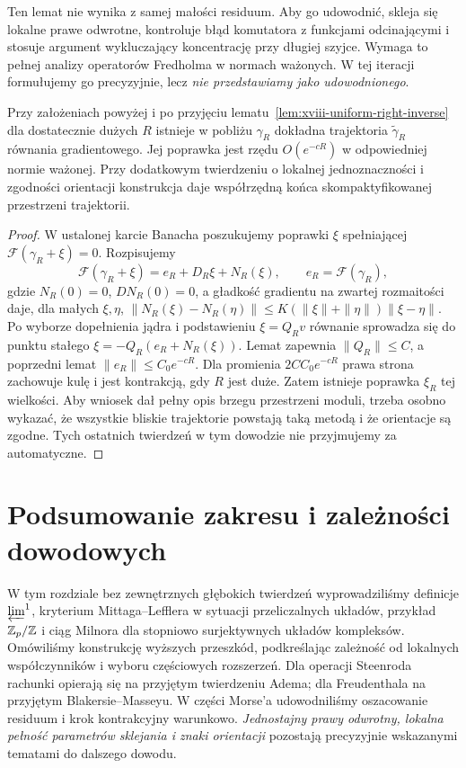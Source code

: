 \begin{uwaga}
Ten lemat nie wynika z samej małości residuum.
Aby go udowodnić, skleja się lokalne prawe odwrotne,
kontroluje błąd komutatora z funkcjami odcinającymi i
stosuje argument wykluczający koncentrację przy długiej szyjce.
Wymaga to pełnej analizy operatorów Fredholma w normach
ważonych. W tej iteracji formułujemy go precyzyjnie,
lecz \emph{nie przedstawiamy jako udowodnionego}.
\end{uwaga}
\begin{twierdzenie}
\label{thm:xviii-gluing-conditional}
Przy założeniach powyżej i po przyjęciu
lematu~\ref{lem:xviii-uniform-right-inverse} dla dostatecznie
dużych $R$ istnieje w pobliżu $\gamma_R$ dokładna
trajektoria $\widetilde\gamma_R$ równania gradientowego.
Jej poprawka jest rzędu $O(e^{-cR})$ w odpowiedniej normie
ważonej. Przy dodatkowym twierdzeniu o lokalnej jednoznaczności
i zgodności orientacji konstrukcja daje współrzędną końca
skompaktyfikowanej przestrzeni trajektorii.
\end{twierdzenie}
\begin{proof}
W ustalonej karcie Banacha poszukujemy poprawki $\xi$
spełniającej $\mathcal F(\gamma_R+\xi)=0$. Rozpisujemy
\[
\mathcal F(\gamma_R+\xi)=e_R+D_R\xi+N_R(\xi),
\qquad e_R=\mathcal F(\gamma_R),
\]
gdzie $N_R(0)=0$, $DN_R(0)=0$, a gładkość gradientu
na zwartej rozmaitości daje, dla małych $\xi,\eta$,
$\|N_R(\xi)-N_R(\eta)\|
\le K(\|\xi\|+\|\eta\|)\|\xi-\eta\|$.
Po wyborze dopełnienia jądra i podstawieniu
$\xi=Q_Rv$ równanie sprowadza się do punktu stałego
$\xi=-Q_R(e_R+N_R(\xi))$.
Lemat zapewnia $\|Q_R\|\le C$, a poprzedni lemat
$\|e_R\|\le C_0e^{-cR}$. Dla promienia
$2CC_0e^{-cR}$ prawa strona zachowuje kulę i jest
kontrakcją, gdy $R$ jest duże. Zatem istnieje poprawka
$\xi_R$ tej wielkości. Aby wniosek dał pełny opis
brzegu przestrzeni moduli, trzeba osobno wykazać, że
wszystkie bliskie trajektorie powstają taką metodą i że
orientacje są zgodne. Tych ostatnich twierdzeń w tym
dowodzie nie przyjmujemy za automatyczne.
\end{proof}

\section{Podsumowanie zakresu i zależności dowodowych}
W tym rozdziale bez zewnętrznych głębokich twierdzeń
wyprowadziliśmy definicje $\varprojlim^1$, kryterium
Mittaga--Lefflera w sytuacji przeliczalnych układów,
przykład $\mathbb{Z}_p/\mathbb{Z}$ i ciąg Milnora dla stopniowo surjektywnych
układów kompleksów. Omówiliśmy konstrukcję
wyższych przeszkód, podkreślając zależność od lokalnych
współczynników i wyboru częściowych rozszerzeń.
Dla operacji Steenroda rachunki opierają się na
przyjętym twierdzeniu Adema; dla Freudenthala na
przyjętym Blakersie--Masseyu.
W części Morse'a udowodniliśmy oszacowanie residuum i
krok kontrakcyjny warunkowo. \emph{Jednostajny prawy odwrotny,
lokalna pełność parametrów sklejania i znaki orientacji}
pozostają precyzyjnie wskazanymi tematami do dalszego dowodu.

\appendix
\renewcommand{\chaptermark}[1]{\markboth{Dodatek \thechapter}{}}
